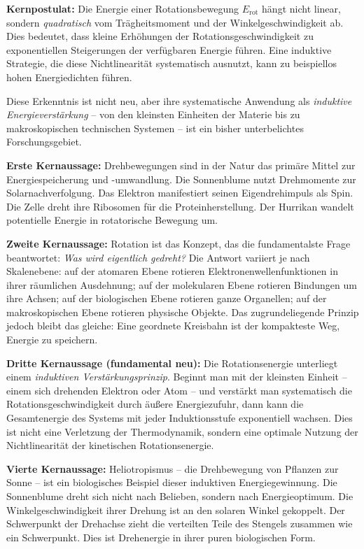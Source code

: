 \documentclass[12pt,a4paper]{report}
\theoremstyle{plain}
\theoremstyle{definition}
\theoremstyle{remark}
\begin{document}
\textbf{Kernpostulat:} Die Energie einer Rotationsbewegung $E_{\text{rot}}$ hängt nicht linear, sondern \emph{quadratisch} vom Trägheitsmoment und der Winkelgeschwindigkeit ab. Dies bedeutet, dass kleine Erhöhungen der Rotationsgeschwindigkeit zu exponentiellen Steigerungen der verfügbaren Energie führen. Eine induktive Strategie, die diese Nichtlinearität systematisch ausnutzt, kann zu beispiellos hohen Energiedichten führen.

Diese Erkenntnis ist nicht neu, aber ihre systematische Anwendung als \emph{induktive Energieverstärkung} -- von den kleinsten Einheiten der Materie bis zu makroskopischen technischen Systemen -- ist ein bisher unterbelichtes Forschungsgebiet.

\textbf{Erste Kernaussage:} Drehbewegungen sind in der Natur das primäre Mittel zur Energiespeicherung und -umwandlung. Die Sonnenblume nutzt Drehmomente zur Solarnachverfolgung. Das Elektron manifestiert seinen Eigendrehimpuls als Spin. Die Zelle dreht ihre Ribosomen für die Proteinherstellung. Der Hurrikan wandelt potentielle Energie in rotatorische Bewegung um.

\textbf{Zweite Kernaussage:} Rotation ist das Konzept, das die fundamentalste Frage beantwortet: \emph{Was wird eigentlich gedreht?} Die Antwort variiert je nach Skalenebene: auf der atomaren Ebene rotieren Elektronenwellenfunktionen in ihrer räumlichen Ausdehnung; auf der molekularen Ebene rotieren Bindungen um ihre Achsen; auf der biologischen Ebene rotieren ganze Organellen; auf der makroskopischen Ebene rotieren physische Objekte. Das zugrundeliegende Prinzip jedoch bleibt das gleiche: Eine geordnete Kreisbahn ist der kompakteste Weg, Energie zu speichern.

\textbf{Dritte Kernaussage (fundamental neu):} Die Rotationsenergie unterliegt einem \emph{induktiven Verstärkungsprinzip}. Beginnt man mit der kleinsten Einheit -- einem sich drehenden Elektron oder Atom -- und verstärkt man systematisch die Rotationsgeschwindigkeit durch äußere Energiezufuhr, dann kann die Gesamtenergie des Systems mit jeder Induktionsstufe exponentiell wachsen. Dies ist nicht eine Verletzung der Thermodynamik, sondern eine optimale Nutzung der Nichtlinearität der kinetischen Rotationsenergie.

\textbf{Vierte Kernaussage:} Heliotropismus -- die Drehbewegung von Pflanzen zur Sonne -- ist ein biologisches Beispiel dieser induktiven Energiegewinnung. Die Sonnenblume dreht sich nicht nach Belieben, sondern nach Energieoptimum. Die Winkelgeschwindigkeit ihrer Drehung ist an den solaren Winkel gekoppelt. Der Schwerpunkt der Drehachse zieht die verteilten Teile des Stengels zusammen wie ein Schwerpunkt. Dies ist Drehenergie in ihrer puren biologischen Form.
\end{document}
